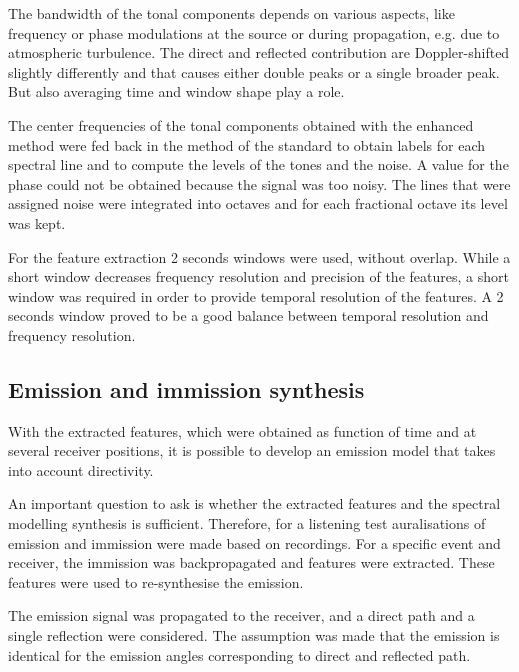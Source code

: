 The bandwidth of the tonal components depends on various aspects, like frequency
or phase modulations at the source or during propagation, e.g. due to
atmospheric turbulence. The direct and reflected contribution are
Doppler-shifted slightly differently and that causes either double peaks or a
single broader peak. But also averaging time and window shape play a role.

The center frequencies of the tonal components obtained with the enhanced method
were fed back in the method of the standard to obtain labels for each spectral
line and to compute the levels of the tones and the noise.
A value for the phase could not be obtained because the signal was too noisy.
The lines that were assigned noise were integrated into  octaves and for each
fractional octave its level was kept.

For the feature extraction 2 seconds windows were used, without overlap.
While a short window decreases frequency resolution and precision of the features, a short
window was required in order to provide temporal resolution of the features.
A 2 seconds window proved to be a good balance between temporal resolution
and frequency resolution.


\subsection{Emission and immission synthesis}
With the extracted features, which were obtained as function of time
and at several receiver positions, it is possible to develop an emission model
that takes into account directivity.

An important question to ask is whether the extracted features and the spectral
modelling synthesis is sufficient. Therefore, for a listening test auralisations
of emission and immission were made based on recordings. For a specific event
and receiver, the immission was backpropagated and features were extracted.
These features were used to re-synthesise the emission.

The emission signal was propagated to the receiver, and a direct path and a
single reflection were considered. The assumption was made that the emission is
identical for the emission angles corresponding to direct and reflected path.


